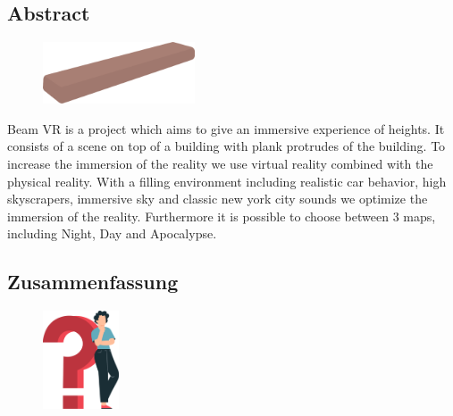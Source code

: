 \begin{spacing}{1}

    \chapter*{Abstract}

\end{spacing}

\begin{figure}

    \begin{center}

        \includegraphics[width=0.4\textwidth]{pics/abstract_picture_1}

    \end{center}

\end{figure}

Beam VR is a project which aims to give an immersive experience of heights.
It consists of a scene on top of a building with plank protrudes of the building.
To increase the immersion of the reality we use virtual reality combined with the physical reality.
With a filling environment including realistic car behavior, high skyscrapers, immersive sky and classic new york city sounds we optimize the immersion of the reality.
Furthermore it is possible to choose between 3 maps, including Night, Day and Apocalypse.

\newpage

\begin{spacing}{1}

    \chapter*{Zusammenfassung}

\end{spacing}

\begin{figure}

    \begin{center}

        \includegraphics[width=0.2\textwidth]{pics/question_mark}

    \end{center}

\end{figure}

